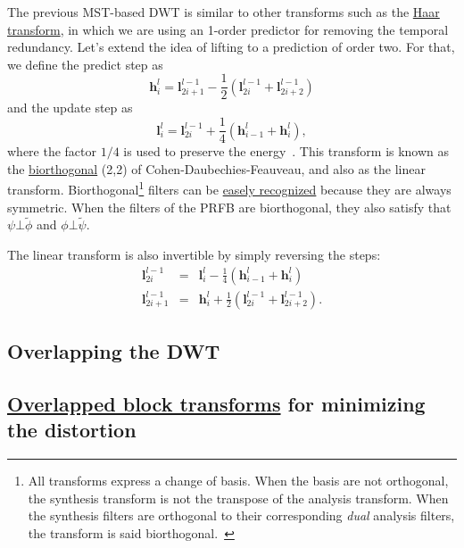 The previous MST-based DWT is similar to other transforms such as the
\href{https://en.wikipedia.org/wiki/Haar_wavelet}{Haar transform}, in
which we are using an 1-order predictor for removing the temporal
redundancy. Let's extend the idea of lifting to a prediction of order
two. For that, we define the predict step as
\begin{equation}
  {\mathbf h}^l_i = {\mathbf l}^{l-1}_{2i+1} - \frac{1}{2}({\mathbf l}^{l-1}_{2i} + {\mathbf l}^{l-1}_{2i+2})
\end{equation}
and the update step as
\begin{equation}
  {\mathbf l}^l_i = {\mathbf l}^{l-1}_{2i} + \frac{1}{4}({\mathbf h}^l_{i-1} + {\mathbf h}^l_i),
\end{equation}
where the factor $1/4$ is used to preserve the
energy~\cite{sweldens1997building}. This transform is known as the
\href{https://en.wikipedia.org/wiki/Biorthogonal_wavelet}{biorthogonal}
(2,2) of Cohen-Daubechies-Feauveau, and also as the linear transform.
Biorthogonal\footnote{All transforms express a change of basis. When
  the basis are not orthogonal, the synthesis transform is not the
  transpose of the analysis transform. When the synthesis filters are
  orthogonal to their corresponding \emph{dual} analysis filters, the
  transform is said biorthogonal.~\cite{vetterli2014foundations}}
filters can be \href{http://wavelets.pybytes.com/}{easely recognized}
because they are always symmetric. When the filters of the PRFB are
biorthogonal, they also satisfy that $\psi\bot\tilde\phi$ and
$\phi\bot\tilde\psi$.

The linear transform is also invertible by simply reversing the steps:
\begin{equation}
  \begin{array}{rcl}
    {\mathbf l}^{l-1}_{2i} & = & {\mathbf l}^l_i - \frac{1}{4}({\mathbf h}^l_{i-1} + {\mathbf h}^l_i)\\
    {\mathbf l}^{l-1}_{2i+1} & = & {\mathbf h}^l_i + \frac{1}{2}({\mathbf l}^{l-1}_{2i} + {\mathbf l}^{l-1}_{2i+2}).
  \end{array}
\end{equation}



\subsection{Overlapping the DWT}

\subsection{\href{https://en.wikipedia.org/wiki/Lapped_transform}{Overlapped block transforms} for minimizing the distortion}

